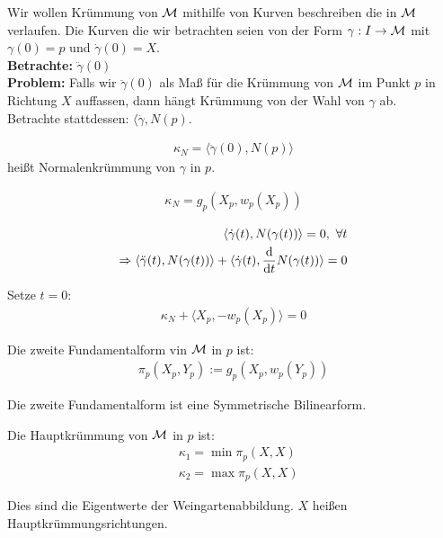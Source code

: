 Wir wollen Krümmung von $\mathcal{M}$ mithilfe von Kurven beschreiben die in $\mathcal{M}$ verlaufen.
Die Kurven die wir betrachten seien von der Form $ \gamma : I \to \mathcal{M}$ mit $\gamma (0) = p$ und $\dot{\gamma} (0)  = X$.\\
\textbf{Betrachte:} $\ddot{\gamma } (0)$\\
\textbf{Problem:} Falls wir $\ddot{\gamma} (0)$ als Maß für die Krümmung von $\mathcal{M}$ im Punkt $p$ in Richtung $X$ 
auffassen, dann hängt Krümmung von der Wahl von $\gamma$ ab.\\
Betrachte stattdessen: $\langle \ddot{\gamma} , N(p)$.
\begin{defs}[Normalenkrümmung]
    \begin{align}
     \kappa_N = \langle \ddot{\gamma}(0) , N(p) \rangle
    \end{align}
    heißt Normalenkrümmung von $\gamma$ in $p$.

\end{defs}
\begin{satz}
    \begin{align}
        \kappa_N = g_p (X_p , w_p (X_p))
    \end{align}

    
\end{satz}
\begin{bew}
    \begin{align*}
        \langle \dot{\gamma}(t) , N ( \gamma (t)) \rangle = 0 , \ \forall t \\
        \Rightarrow \langle \ddot{\gamma}(t) , N(\gamma (t))\rangle + \langle \dot{\gamma}(t) , \dv{t}N ( \gamma (t)) \rangle = 0   
    \end{align*}

    Setze $t=0$:
    \begin{align}
        \kappa_N + \langle X_p , - w_p (X_p) \rangle = 0
    \end{align}
\end{bew}

\begin{defs}
    Die zweite Fundamentalform vin $\mathcal{M}$ in $p$ ist:
    \begin{align}
        \pi_p (X_p , Y_p) := g_p (X_p , w_p (Y_p))
    \end{align}
\end{defs}
\begin{bem}
    Die zweite Fundamentalform ist eine Symmetrische Bilinearform.
\end{bem}

\begin{defs}[Hauptkrümmung]
    Die Hauptkrümmung von $\mathcal{M}$ in $p$ ist:
    \begin{align}
        & \kappa_1 = \min \pi_p (X , X) \\
        & \kappa_2 = \max \pi_p (X  , X)
    \end{align}

    Dies sind die Eigentwerte der Weingartenabbildung.
    $X$ heißen Hauptkrümmungsrichtungen.
\end{defs}











